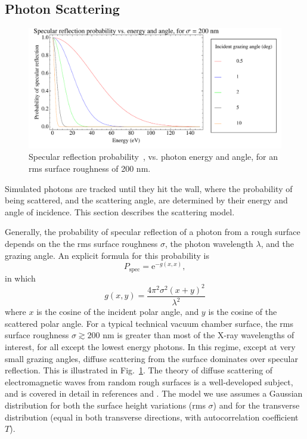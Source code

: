 \documentclass[11pt]{article}
\begin{document}
\subsection{Photon Scattering} 

  \begin{figure}
  \centering
  \includegraphics[width=6in]{specular-probability.pdf}
  \caption[Specular reflection probability vs. photon energy and angle]
{\label{f:spec.prob}
Specular reflection probability~\cite{b:beckmann}, vs. photon energy
and angle, for an rms surface roughness of 200 nm.}
  \end{figure}
   
Simulated photons are tracked until they hit the wall, where the
probability of being scattered, and the scattering angle, are
determined by their energy and angle of incidence.  This section
describes the scattering model.

Generally, the probability of specular reflection of a photon from a
rough surface depends on the the rms surface roughness $\sigma$, the
photon wavelength $\lambda$, and the grazing angle. An explicit
formula for this probability is~\cite{b:beckmann}
   \begin{equation}
P_{\textrm{spec}}=\textrm{e}^{-g(x,x)},
\end{equation}
in which
   \begin{equation}
g(x,y)=\frac{4\pi^{2}\sigma^{2}(x+y)^{2}}{\lambda^{2}}
  \end{equation}
where $x$ is the cosine of the incident polar angle, and $y$ is the
cosine of the scattered polar angle. For a typical technical vacuum
chamber surface, the rms surface roughness $\sigma \gtrsim 200$ nm is
greater than most of the X-ray wavelengths of interest, for all except
the lowest energy photons. In this regime, except at very small
grazing angles, diffuse scattering from the surface dominates over
specular reflection. This is illustrated in Fig.~\ref{f:spec.prob}.
The theory of diffuse scattering of electromagnetic waves from random
rough surfaces is a well-developed subject, and is covered in detail
in references \cite{b:beckmann} and \cite{b:ogilvy}. The model we use
assumes a Gaussian distribution for both the surface height variations
(rms $\sigma$) and for the transverse distribution (equal in both
transverse directions, with autocorrelation coefficient $T$).
\end{document}

